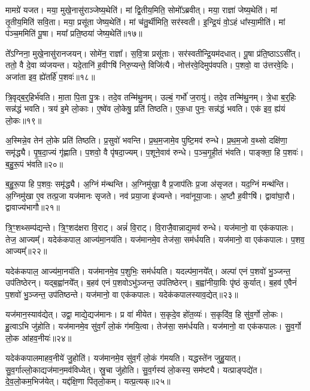 मामग्रे॑ यजत।
मया॒ मुखे॒नासु॑राञ्जेष्य॒थेति॑।
मां द्वि॒तीय॒मिति॒ सोमो᳚\-ऽब्रवीत्।
मया॒ राज्ञा॑ जेष्य॒थेति॑।
मां तृ॒तीय॒मिति॑ सवि॒ता।
मया॒ प्रसू॑ता जेष्य॒थेति॑।
मां च॑तु॒र्थीमिति॒ सर॑स्वती।
इ॒न्द्रि॒यं वो॒ऽहं धा᳚स्या॒मीति॑।
मां प॑ञ्च॒ममिति॑ पू॒षा।
मया᳚ प्रति॒ष्ठया॑ जेष्य॒थेति॑॥१७॥

ते᳚ऽग्निना॒ मुखे॒नासु॑रानजयन्।
सोमे॑न॒ राज्ञा᳚।
स॒वि॒त्रा प्रसू॑ताः।
सर॑स्वतीन्द्रि॒यम॑दधात्।
पू॒षा प्र॑ति॒ष्ठा\-ऽऽसी᳚त्।
ततो॒ वै दे॒वा व्य॑जयन्त।
यदे॒तानि॑ ह॒वीꣳषि॑ निरु॒प्यन्ते॒ विजि॑त्यै।
नोत्त॑रवे॒दिमुप॑वपति।
प॒शवो॒ वा उ॑त्तरवे॒दिः।
अजा॑ता इव॒ ह्ये॑तर्\mbox{}हि॑ प॒शवः॑॥१८॥\anuvakamend[ऐ॒दित्य॑शोचद्व्यु॒द्धर॑त्यब्रवीत्प्रति॒ष्ठया॑ जेष्य॒थेत्ये॒तर्\mbox{}हि॑ प॒शवः॑]

त्रि॒वृद्ब॒र्॒हिर्भ॑वति।
मा॒ता पि॒ता पु॒त्रः।
तदे॒व तन्मि॑थु॒नम्।
उल्बं॒ गर्भो॑ ज॒रायु॑।
तदे॒व तन्मि॑थु॒नम्।
त्रे॒धा ब॒र्॒हिः सन्न॑द्धं भवति।
त्रय॑ इ॒मे लो॒काः।
ए॒ष्वे॑व लो॒केषु॒ प्रति॑ तिष्ठति।
ए॒क॒धा पुनः॒ सन्न॑द्धं भवति।
एक॑ इव॒ ह्य॑यं लो॒कः॥१९॥

अ॒स्मिन्ने॒व तेन॑ लो॒के प्रति॑ तिष्ठति।
प्र॒सुवो॑ भवन्ति।
प्र॒थ॒म॒जामे॒व पुष्टि॒मव॑ रुन्धे।
प्र॒थ॒म॒जो व॒थ्सो दक्षि॑णा॒ समृ॑द्ध्यै।
पृ॒ष॒दा॒ज्यं गृ॑ह्णाति।
प॒शवो॒ वै पृ॑षदा॒ज्यम्।
प॒शूने॒वाव॑ रुन्धे।
प॒ञ्च॒गृ॒ही॒तं भ॑वति।
पाङ्क्ता॒ हि प॒शवः॑।
ब॒हु॒रू॒पं भ॑वति॥२०॥

ब॒हु॒रू॒पा हि प॒शवः॒ समृ॑द्ध्यै।
अ॒ग्निं म॑न्थन्ति।
अ॒ग्निमु॑खा॒ वै प्र॒जा\-प॑तिः प्र॒जा अ॑\-सृजत।
यद॒ग्निं मन्थ॑न्ति।
अ॒ग्निमु॑खा ए॒व तत्प्र॒जा यज॑मानः \-सृजते।
नव॑ प्रया॒जा इ॑ज्यन्ते।
नवा॑नूया॒जाः।
अ॒ष्टौ ह॒वीꣳषि॑।
द्वावा॑घा॒रौ।
द्वावाज्य॑भागौ॥२१॥

त्रि॒ꣳ॒शथ्सम्प॑द्यन्ते।
त्रि॒ꣳ॒शद॑क्षरा वि॒राट्।
अन्नं॑ वि॒राट्।
वि॒राजै॒वान्नाद्य॒मव॑ रुन्धे।
यज॑मानो॒ वा एक॑कपालः।
तेज॒ आज्यम्᳚।
यदेक॑कपाल॒ आज्य॑मा॒नय॑ति।
यज॑मानमे॒व तेज॑सा॒ सम॑र्धयति।
यज॑मानो॒ वा एक॑कपालः।
प॒शव॒ आज्यम्᳚॥२२॥

यदेक॑कपाल॒ आज्य॑मा॒नय॑ति।
यज॑मानमे॒व प॒शुभिः॒ सम॑र्धयति।
यदल्प॑मा॒नये᳚त्।
अल्पा॑ एनं प॒शवो॑ भु॒ञ्जन्त॒ उप॑तिष्ठेरन्।
यद्ब॒ह्वा॑नये᳚त्।
ब॒हव॑ एनं प॒शवो\-ऽभु॑ञ्जन्त॒ उप॑तिष्ठेरन्।
ब॒ह्वा॑नीया॒विः पृ॑ष्ठं कुर्यात्।
ब॒हव॑ ए॒वैनं॑ प॒शवो॑ भु॒ञ्जन्त॒ उप॑तिष्ठन्ते।
यज॑मानो॒ वा एक॑कपालः।
यदेक॑कपालस्याव॒द्येत्॥२३॥

यज॑मान॒स्याव॑द्येत्।
उद्वा॒ माद्ये॒द्यज॑मानः।
प्र वा॑ मीयेत।
स॒कृदे॒व हो॑त॒व्यः॑।
स॒कृदि॑व॒ हि सु॑व॒र्गो लो॒कः।
हु॒त्वाऽभि जु॑होति।
यज॑मानमे॒व सु॑व॒र्गं लो॒कं ग॑मयि॒त्वा।
तेज॑सा॒ सम॑र्धयति।
यज॑मानो॒ वा एक॑कपालः।
सु॒व॒र्गो लो॒क आ॑हव॒नीयः॑॥२४॥

यदेक॑कपालमाहव॒नीये॑ जु॒होति॑।
यज॑मानमे॒व सु॑व॒र्गं लो॒कं ग॑मयति।
यद्धस्ते॑न जुहु॒यात्।
सु॒व॒र्गाल्लो॒काद्यज॑मान॒मव॑\-विध्येत्।
स्रु॒चा जु॑होति।
सु॒व॒र्गस्य॑ लो॒कस्य॒ सम॑ष्ट्यै।
यत्प्राङ्पद्ये॑त।
दे॒व॒लो॒कम॒भिज॑येत्।
यद्द॑क्षि॒णा पि॑तृलो॒कम्।
यत्प्र॒त्यक्॥२५॥

